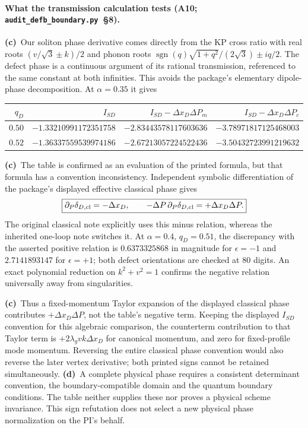 \documentclass[11pt,a4paper]{article}
\newcommand{\Lc}{\textbf{(c)}\ }
\newcommand{\Ld}{\textbf{(d)}\ }
\newcommand{\scr}{\texttt{audit\_\allowbreak defb\_\allowbreak boundary.py}}
\newcommand{\file}[1]{\texttt{\detokenize{#1}}}
\begin{document}
\paragraph{What the transmission calculation tests (A10; \scr\ §8).}
\Lc Our soliton phase derivative comes directly from the KP cross ratio
with real roots $(v/\sqrt3\pm k)/2$ and phonon roots
$\operatorname{sgn}(q)\sqrt{1+q^2}/(2\sqrt3)\pm iq/2$.
The defect phase is a continuous argument of its rational transmission,
referenced to the same constant at both infinities. This avoids the
package's elementary dipole-phase decomposition. At $\alpha=0.35$ it gives
\begin{center}\small
\begin{tabular}{rrrr}\toprule
$q_D$ & $I_{SD}$ & $I_{SD}-\Delta x_D\Delta P_m$ & $I_{SD}-\Delta x_D\Delta P_c$\\\midrule
$0.50$ & $-1.33210991172351758$ & $-2.83443578117603636$ & $-3.78971817125468003$\\
$0.52$ & $-1.36337559539974186$ & $-2.67213057224522436$ & $-3.50432723991219632$\\\bottomrule
\end{tabular}
\end{center}
\Lc The table is confirmed as an evaluation of the printed formula, but
that formula has a convention inconsistency. Independent symbolic
 differentiation of the package's displayed effective classical phase gives
\begin{equation}
 \boxed{\partial_P\delta_{D,\rm cl}=-\Delta x_D,\qquad
 -\Delta P\,\partial_P\delta_{D,\rm cl}=+\Delta x_D\Delta P.}
 \label{eq:phasesign}
\end{equation}
The original classical note \file{defect_semiclassics.tex} explicitly uses
this minus relation, whereas the inherited one-loop note switches it.
At $\alpha=0.4$, $q_D=0.51$, the discrepancy with the asserted positive
relation is $0.6373325868$ in magnitude for $\epsilon=-1$ and
$2.7141893147$ for $\epsilon=+1$; both defect orientations are checked
at 80 digits. An exact polynomial reduction on $k^2+v^2=1$ confirms the
negative relation universally away from singularities.

\Lc Thus a fixed-momentum Taylor expansion of the displayed classical
phase contributes $+\Delta x_D\Delta P$, not the table's negative term.
Keeping the displayed $I_{SD}$ convention for this algebraic comparison,
the counterterm contribution to that Taylor term is
$+2\lambda_gvk\Delta x_D$ for canonical momentum, and zero for
fixed-profile mode momentum. Reversing the entire classical phase convention
would also reverse the later vertex derivative; both printed signs cannot
be retained simultaneously. \Ld A complete physical phase requires a
consistent determinant convention, the boundary-compatible domain and the
quantum boundary conditions. The table neither supplies these nor proves a
physical scheme invariance. This sign refutation does not select a new
physical phase normalization on the PI's behalf.
\end{document}
